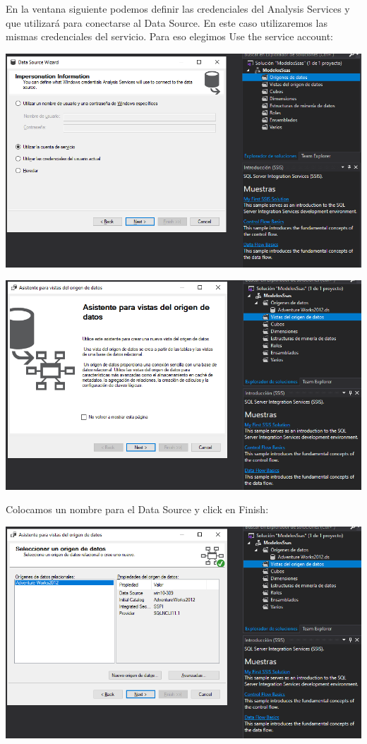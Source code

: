 En la ventana siguiente podemos definir las credenciales del Analysis Services y que utilizará para conectarse al Data Source. En este caso utilizaremos las mismas credenciales del servicio. Para eso elegimos Use the service account:
	\begin{center}
	\includegraphics[width=\columnwidth]{images/task1/6}
    \end{center}	
    
	\begin{center}
	\includegraphics[width=\columnwidth]{images/task1/7}
    \end{center}	
Colocamos un nombre para el Data Source y click en Finish:
	\begin{center}
	\includegraphics[width=\columnwidth]{images/task1/8}
    \end{center}	
